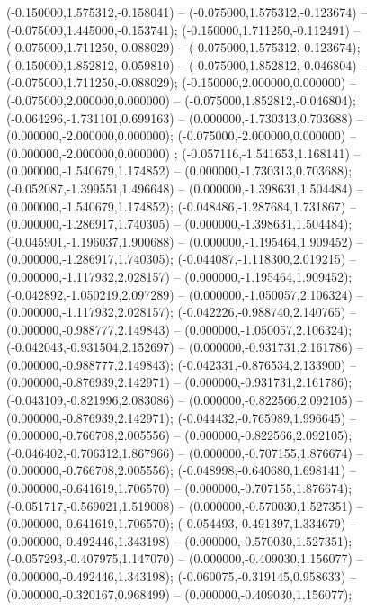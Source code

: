  (-0.150000,1.575312,-0.158041) -- (-0.075000,1.575312,-0.123674) -- (-0.075000,1.445000,-0.153741);
 (-0.150000,1.711250,-0.112491) -- (-0.075000,1.711250,-0.088029) -- (-0.075000,1.575312,-0.123674);
 (-0.150000,1.852812,-0.059810) -- (-0.075000,1.852812,-0.046804) -- (-0.075000,1.711250,-0.088029);
 (-0.150000,2.000000,0.000000) -- (-0.075000,2.000000,0.000000) -- (-0.075000,1.852812,-0.046804);
 (-0.064296,-1.731101,0.699163) -- (0.000000,-1.730313,0.703688) -- (0.000000,-2.000000,0.000000);
 (-0.075000,-2.000000,0.000000) -- (0.000000,-2.000000,0.000000) ;
 (-0.057116,-1.541653,1.168141) -- (0.000000,-1.540679,1.174852) -- (0.000000,-1.730313,0.703688);
 (-0.052087,-1.399551,1.496648) -- (0.000000,-1.398631,1.504484) -- (0.000000,-1.540679,1.174852);
 (-0.048486,-1.287684,1.731867) -- (0.000000,-1.286917,1.740305) -- (0.000000,-1.398631,1.504484);
 (-0.045901,-1.196037,1.900688) -- (0.000000,-1.195464,1.909452) -- (0.000000,-1.286917,1.740305);
 (-0.044087,-1.118300,2.019215) -- (0.000000,-1.117932,2.028157) -- (0.000000,-1.195464,1.909452);
 (-0.042892,-1.050219,2.097289) -- (0.000000,-1.050057,2.106324) -- (0.000000,-1.117932,2.028157);
 (-0.042226,-0.988740,2.140765) -- (0.000000,-0.988777,2.149843) -- (0.000000,-1.050057,2.106324);
 (-0.042043,-0.931504,2.152697) -- (0.000000,-0.931731,2.161786) -- (0.000000,-0.988777,2.149843);
 (-0.042331,-0.876534,2.133900) -- (0.000000,-0.876939,2.142971) -- (0.000000,-0.931731,2.161786);
 (-0.043109,-0.821996,2.083086) -- (0.000000,-0.822566,2.092105) -- (0.000000,-0.876939,2.142971);
 (-0.044432,-0.765989,1.996645) -- (0.000000,-0.766708,2.005556) -- (0.000000,-0.822566,2.092105);
 (-0.046402,-0.706312,1.867966) -- (0.000000,-0.707155,1.876674) -- (0.000000,-0.766708,2.005556);
 (-0.048998,-0.640680,1.698141) -- (0.000000,-0.641619,1.706570) -- (0.000000,-0.707155,1.876674);
 (-0.051717,-0.569021,1.519008) -- (0.000000,-0.570030,1.527351) -- (0.000000,-0.641619,1.706570);
 (-0.054493,-0.491397,1.334679) -- (0.000000,-0.492446,1.343198) -- (0.000000,-0.570030,1.527351);
 (-0.057293,-0.407975,1.147070) -- (0.000000,-0.409030,1.156077) -- (0.000000,-0.492446,1.343198);
 (-0.060075,-0.319145,0.958633) -- (0.000000,-0.320167,0.968499) -- (0.000000,-0.409030,1.156077);

